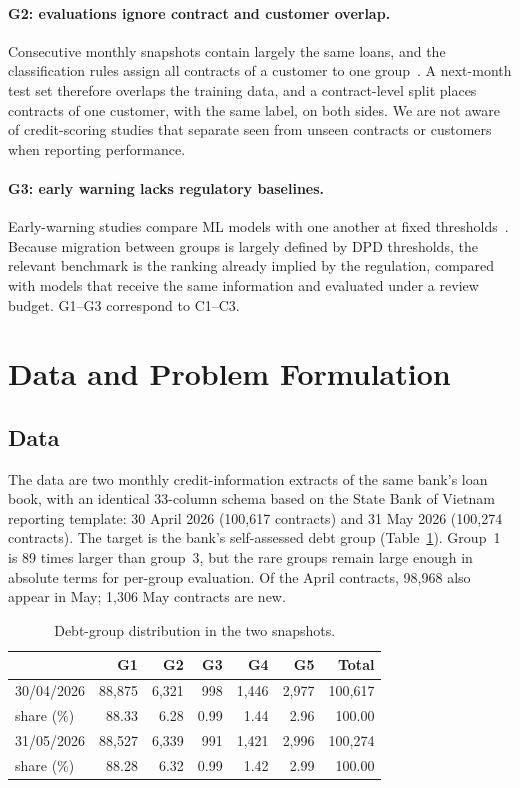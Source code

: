 \documentclass[runningheads]{llncs}
\begin{document}
\paragraph{G2: evaluations ignore contract and customer overlap.} Consecutive monthly snapshots contain largely the same loans, and the classification rules assign all contracts of a customer to one group~\cite{sbv2024tt31}. A next-month test set therefore overlaps the training data, and a contract-level split places contracts of one customer, with the same label, on both sides. We are not aware of credit-scoring studies that separate seen from unseen contracts or customers when reporting performance.

\paragraph{G3: early warning lacks regulatory baselines.} Early-warning studies compare ML models with one another at fixed thresholds~\cite{nguyen2024ews}. Because migration between groups is largely defined by DPD thresholds, the relevant benchmark is the ranking already implied by the regulation, compared with models that receive the same information and evaluated under a review budget. G1--G3 correspond to C1--C3.

\section{Data and Problem Formulation}
\label{sec:data}

\subsection{Data}

The data are two monthly credit-information extracts of the same bank's loan book, with an identical 33-column schema based on the State Bank of Vietnam reporting template: 30 April 2026 (100,617 contracts) and 31 May 2026 (100,274 contracts). The target is the bank's self-assessed debt group (Table~\ref{tab:dist}). Group~1 is 89 times larger than group~3, but the rare groups remain large enough in absolute terms for per-group evaluation. Of the April contracts, 98,968 also appear in May; 1,306 May contracts are new.

\begin{table}[t]
\centering
\caption{Debt-group distribution in the two snapshots.}
\label{tab:dist}
\small
\begin{tabular}{@{}lrrrrrr@{}}
\toprule
& G1 & G2 & G3 & G4 & G5 & Total\\
\midrule
30/04/2026 & 88,875 & 6,321 & 998 & 1,446 & 2,977 & 100,617\\
\quad share (\%) & 88.33 & 6.28 & 0.99 & 1.44 & 2.96 & 100.00\\
31/05/2026 & 88,527 & 6,339 & 991 & 1,421 & 2,996 & 100,274\\
\quad share (\%) & 88.28 & 6.32 & 0.99 & 1.42 & 2.99 & 100.00\\
\bottomrule
\end{tabular}
\end{table}
\end{document}
